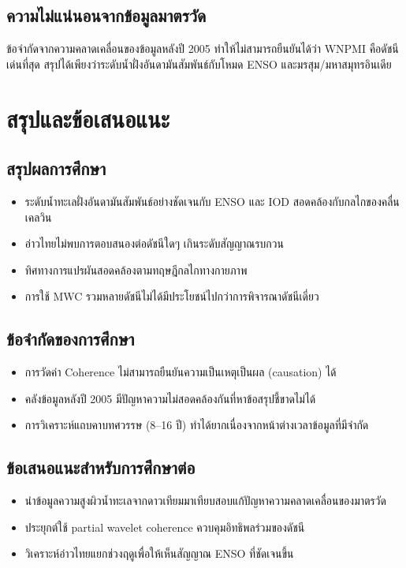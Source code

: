\documentclass[a4paper,11pt]{article}
\begin{document}
\subsection{ความไม่แน่นอนจากข้อมูลมาตรวัด}

ข้อจำกัดจากความคลาดเคลื่อนของข้อมูลหลังปี 2005 ทำให้ไม่สามารถยืนยันได้ว่า WNPMI คือดัชนีเด่นที่สุด
สรุปได้เพียงว่าระดับน้ำฝั่งอันดามันสัมพันธ์กับโหมด ENSO และมรสุม/มหาสมุทรอินเดีย

\section{สรุปและข้อเสนอแนะ}

\subsection{สรุปผลการศึกษา}

\begin{itemize}
  \item ระดับน้ำทะเลฝั่งอันดามันสัมพันธ์อย่างชัดเจนกับ ENSO และ IOD สอดคล้องกับกลไกของคลื่นเคลวิน
  \item อ่าวไทยไม่พบการตอบสนองต่อดัชนีใดๆ เกินระดับสัญญาณรบกวน
  \item ทิศทางการแปรผันสอดคล้องตามทฤษฎีกลไกทางกายภาพ
  \item การใช้ MWC รวมหลายดัชนีไม่ได้มีประโยชน์ไปกว่าการพิจารณาดัชนีเดี่ยว
\end{itemize}

\subsection{ข้อจำกัดของการศึกษา}

\begin{itemize}
  \item การวัดค่า Coherence ไม่สามารถยืนยันความเป็นเหตุเป็นผล (causation) ได้
  \item คลังข้อมูลหลังปี 2005 มีปัญหาความไม่สอดคล้องกันที่หาข้อสรุปชี้ขาดไม่ได้
  \item การวิเคราะห์แถบคาบทศวรรษ (8–16 ปี) ทำได้ยากเนื่องจากหน้าต่างเวลาข้อมูลที่มีจำกัด
\end{itemize}

\subsection{ข้อเสนอแนะสำหรับการศึกษาต่อ}

\begin{itemize}
  \item นำข้อมูลความสูงผิวน้ำทะเลจากดาวเทียมมาเทียบสอบแก้ปัญหาความคลาดเคลื่อนของมาตรวัด
  \item ประยุกต์ใช้ partial wavelet coherence ควบคุมอิทธิพลร่วมของดัชนี
  \item วิเคราะห์อ่าวไทยแยกช่วงฤดูเพื่อให้เห็นสัญญาณ ENSO ที่ชัดเจนขึ้น
\end{itemize}
\end{document}
